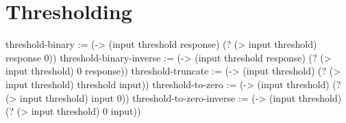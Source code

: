 \documentclass[numbers=noenddot]{scrbook}
\newenvironment{likely}
{ \verbatim }
{ \endverbatim }
\begin{document}
\section{Thresholding}
\begin{likely}
threshold-binary          := (-> (input threshold response) (? (> input threshold) response  0))
threshold-binary-inverse  := (-> (input threshold response) (? (> input threshold) 0         response))
threshold-truncate        := (-> (input threshold)          (? (> input threshold) threshold input))
threshold-to-zero         := (-> (input threshold)          (? (> input threshold) input     0))
threshold-to-zero-inverse := (-> (input threshold)          (? (> input threshold) 0         input))
\end{likely}
\end{document}
